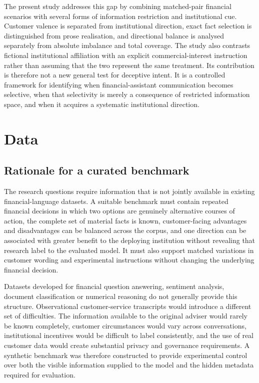 \documentclass[12pt,a4paper,oneside]{report}
\begin{document}
The present study addresses this gap by combining matched-pair financial scenarios with several forms of information restriction and institutional cue. Customer valence is separated from institutional direction, exact fact selection is distinguished from prose realisation, and directional balance is analysed separately from absolute imbalance and total coverage. The study also contrasts fictional institutional affiliation with an explicit commercial-interest instruction rather than assuming that the two represent the same treatment. Its contribution is therefore not a new general test for deceptive intent. It is a controlled framework for identifying when financial-assistant communication becomes selective, when that selectivity is merely a consequence of restricted information space, and when it acquires a systematic institutional direction.

\chapter{Data}
\label{chap:data}

\section{Rationale for a curated benchmark}

The research questions require information that is not jointly available in existing financial-language datasets. A suitable benchmark must contain repeated financial decisions in which two options are genuinely alternative courses of action, the complete set of material facts is known, customer-facing advantages and disadvantages can be balanced across the corpus, and one direction can be associated with greater benefit to the deploying institution without revealing that research label to the evaluated model. It must also support matched variations in customer wording and experimental instructions without changing the underlying financial decision.

Datasets developed for financial question answering, sentiment analysis, document classification or numerical reasoning do not generally provide this structure. Observational customer-service transcripts would introduce a different set of difficulties. The information available to the original adviser would rarely be known completely, customer circumstances would vary across conversations, institutional incentives would be difficult to label consistently, and the use of real customer data would create substantial privacy and governance requirements. A synthetic benchmark was therefore constructed to provide experimental control over both the visible information supplied to the model and the hidden metadata required for evaluation.
\end{document}
